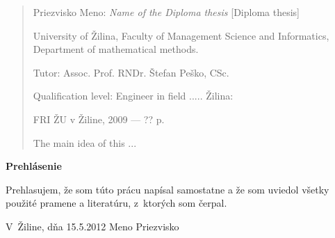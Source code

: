 

\begin{abstract}

\noindent
{\sc Priezvisko Meno:} {\em Name of the Diploma thesis}
[Diploma thesis]

\noindent
University of Žilina,
Faculty of Management Science and Informatics,
Department of mathematical methods.

\noindent
Tutor:  Assoc. Prof. RNDr. Štefan Peško, CSc.

\noindent
Qualification level:
Engineer in field ..... Žilina:

\noindent
FRI ŽU v Žiline, 2009 --- ?? p.

\bigskip

The main idea of this ...

\end{abstract}


\newpage

\centerline{\bf Prehlásenie}

\vspace{2em}

\noindent
Prehlasujem, že som túto prácu napísal samostatne a že som uviedol
všetky použité pramene a literatúru, z~ktorých som čerpal.

\vspace{2em}

\noindent
V~Žiline, dňa 15.5.2012
\hfill
Meno Priezvisko
